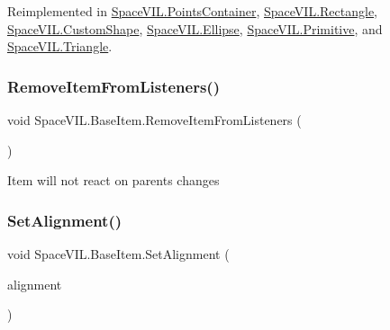 Reimplemented in \mbox{\hyperlink{class_space_v_i_l_1_1_points_container_a7fd8cf39e463780c871d538b884a3fdb}{Space\+V\+I\+L.\+Points\+Container}}, \mbox{\hyperlink{class_space_v_i_l_1_1_rectangle_acc0a5018e266efaa750459bb875eb805}{Space\+V\+I\+L.\+Rectangle}}, \mbox{\hyperlink{class_space_v_i_l_1_1_custom_shape_aa8a1eb76ab361eea35540787f79fac6f}{Space\+V\+I\+L.\+Custom\+Shape}}, \mbox{\hyperlink{class_space_v_i_l_1_1_ellipse_aa2311fd87e9a988eca0d754ad6e9093d}{Space\+V\+I\+L.\+Ellipse}}, \mbox{\hyperlink{class_space_v_i_l_1_1_primitive_a4e7ed3f8d9e28e0063c36f4f2bf470cd}{Space\+V\+I\+L.\+Primitive}}, and \mbox{\hyperlink{class_space_v_i_l_1_1_triangle_a454090bb2cb1e8635643fce5ecfd7e7c}{Space\+V\+I\+L.\+Triangle}}.

\mbox{\label{class_space_v_i_l_1_1_base_item_a07e16796013b2e7d71b303c006ea2bc7}} 
\subsubsection{\texorpdfstring{Remove\+Item\+From\+Listeners()}{RemoveItemFromListeners()}}
{\footnotesize\ttfamily void Space\+V\+I\+L.\+Base\+Item.\+Remove\+Item\+From\+Listeners (\begin{DoxyParamCaption}{ }\end{DoxyParamCaption})\hspace{0.3cm}{\ttfamily [inline]}}



Item will not react on parent\textquotesingle{}s changes 

\mbox{\label{class_space_v_i_l_1_1_base_item_a2e307fb7749ddd02e3cf7489849be9f0}} 
\subsubsection{\texorpdfstring{Set\+Alignment()}{SetAlignment()}}
{\footnotesize\ttfamily void Space\+V\+I\+L.\+Base\+Item.\+Set\+Alignment (\begin{DoxyParamCaption}\item[{Item\+Alignment}]{alignment }\end{DoxyParamCaption})\hspace{0.3cm}{\ttfamily [inline]}}



